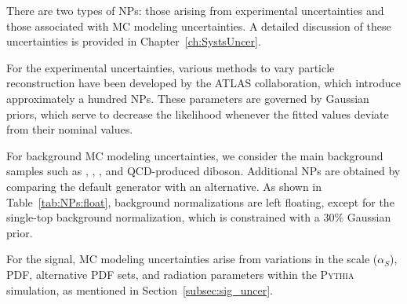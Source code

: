 There are two types of NPs: those arising from experimental uncertainties and those associated with MC modeling uncertainties. A detailed discussion of these uncertainties is provided in Chapter~\ref{ch:SystsUncer}. 

For the experimental uncertainties, various methods to vary particle reconstruction have been developed by the ATLAS collaboration, which introduce approximately a hundred NPs. These parameters are governed by Gaussian priors, which serve to decrease the likelihood whenever the fitted values deviate from their nominal values.

For background MC modeling uncertainties, we consider the main background samples such as \ttbar, \Wjets, \Zjets, and QCD-produced diboson. Additional NPs are obtained by comparing the default generator with an alternative. As shown in Table~\ref{tab:NPs:float}, background normalizations are left floating, except for the single-top background normalization, which is constrained with a 30\% Gaussian prior.

For the signal, MC modeling uncertainties arise from variations in the scale ($\alpha_S$),
PDF, alternative PDF sets, and radiation parameters within the \textsc{Pythia} simulation, as mentioned in Section~\ref{subsec:sig_uncer}.

%

